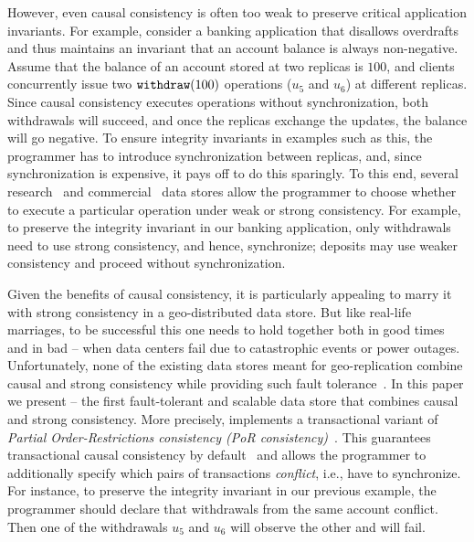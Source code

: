However, even causal consistency is often too weak to preserve critical
application invariants. For example, consider a banking application that
disallows overdrafts and thus maintains an invariant that an account balance is
always non-negative. Assume that the %
balance of an account stored at two replicas is $100$, and clients concurrently
issue two ${\tt withdraw}(100)$ operations ($u_5$ and $u_6$) at different
replicas. Since causal consistency executes operations without synchronization,
both withdrawals will succeed, and once the replicas exchange the updates, the
balance will go negative. To ensure integrity invariants in examples such as
this, the programmer has to introduce synchronization between replicas, and,
since synchronization is expensive, it pays off to do this sparingly. To this
end, several research~\cite{red-blue,valter,pileus,por} and
commercial~\cite{cosmosdb,documentdb,google,dynamodb,cassandra} data stores
allow the programmer to choose whether to execute a particular operation under
weak or strong consistency. For example, to preserve the integrity invariant in
our banking application, only withdrawals need to use strong consistency, and
hence, synchronize; deposits may use weaker consistency and proceed without
synchronization.

Given the benefits of causal consistency, it is particularly appealing to marry
it with strong consistency in a geo-distributed data store. But like real-life
marriages, to be successful this one needs to hold together both in good times
and in bad -- when data centers fail due to catastrophic events or power
outages. Unfortunately, none of the existing data stores meant for
geo-replication combine causal and
strong consistency while providing such fault tolerance~\cite{valter,red-blue,por}.
In this paper we present \System{} -- the first fault-tolerant and scalable data
store that combines causal and strong consistency. More precisely, \System
implements a transactional variant of {\em Partial Order-Restrictions
  consistency (PoR consistency)}~\cite{por,cise-popl16}. This guarantees
transactional causal consistency by default~\cite{cure} and allows the
programmer to additionally specify which pairs of transactions \emph{conflict},
i.e., have to synchronize. For instance, to preserve the integrity invariant in
our previous example, the programmer should declare that withdrawals from the
same account conflict. Then one of the withdrawals $u_5$ and $u_6$ will observe
the other and will fail.



